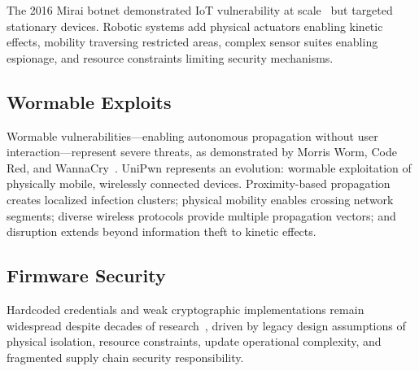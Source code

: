 \documentclass[journal]{IEEEtran}
\begin{document}
The 2016 Mirai botnet demonstrated IoT vulnerability at scale~\cite{antonakakis2017understanding}
but targeted stationary devices. Robotic systems add physical actuators enabling kinetic
effects, mobility traversing restricted areas, complex sensor suites enabling espionage,
and resource constraints limiting security mechanisms.

\subsection{Wormable Exploits}

Wormable vulnerabilities---enabling autonomous propagation without user
interaction---represent severe threats, as demonstrated by Morris Worm, Code Red, and
WannaCry~\cite{weaver2003very}. UniPwn represents an evolution: wormable exploitation of
physically mobile, wirelessly connected devices. Proximity-based propagation creates
localized infection clusters; physical mobility enables crossing network segments; diverse
wireless protocols provide multiple propagation vectors; and disruption extends beyond
information theft to kinetic effects.

\subsection{Firmware Security}

Hardcoded credentials and weak cryptographic implementations remain widespread despite
decades of research~\cite{costin2014large}, driven by legacy design assumptions of
physical isolation, resource constraints, update operational complexity, and fragmented
supply chain security responsibility.
\end{document}
